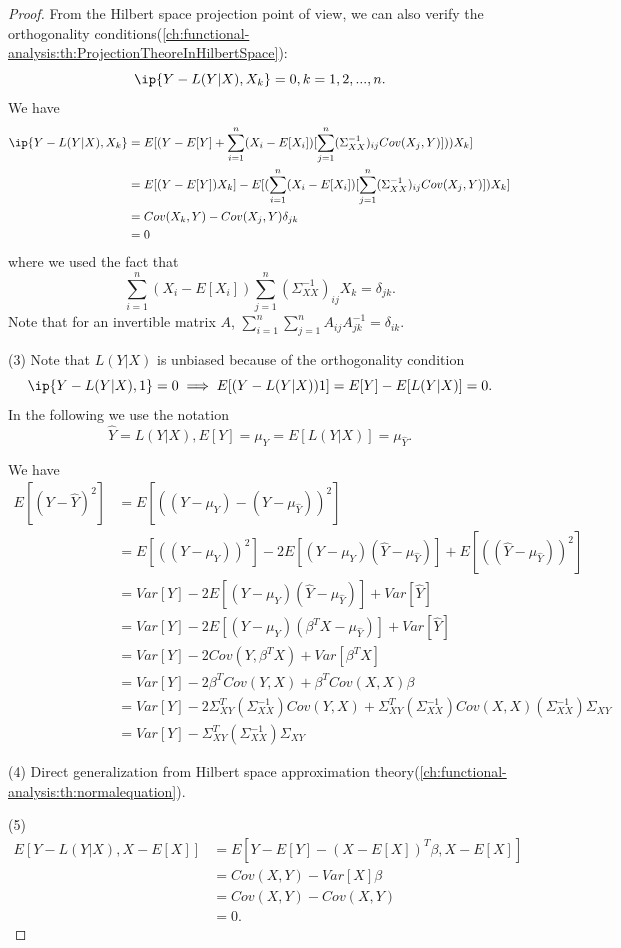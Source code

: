 \begin{refsection}
\begin{proof}
From the Hilbert space projection point of view, we can also verify the orthogonality conditions(\autoref{ch:functional-analysis:th:ProjectionTheoreInHilbertSpace}):
$$\ip{Y-L(Y|X),X_k} = 0,k=1,2,...,n.$$
We have
\begin{align*}
\ip{Y-L(Y|X),X_k} &= E[(Y-E[Y] + \sum_{i=1}^n (X_i - E[X_i]) [\sum_{j=1}^n(\Sigma_{XX}^{-1})_{ij}Cov(X_j,Y)]))X_k] \\
&=E[(Y - E[Y])X_k] -  E[(\sum_{i=1}^n (X_i - E[X_i]) [\sum_{j=1}^n(\Sigma_{XX}^{-1})_{ij}Cov(X_j,Y)])X_k] \\
&=Cov(X_k,Y) - Cov(X_j,Y)\delta_{jk} \\
&=0 
\end{align*}
where we used the fact that
$$\sum_{i=1}^n (X_i - E[X_i]) \sum_{j=1}^n(\Sigma_{XX}^{-1})_{ij}X_k  = \delta_{jk}.$$
Note that for an invertible matrix $A$, $\sum_{i=1}^n\sum_{j=1}^n A_{ij}A^{-1}_{jk} = \delta_{ik}.$


(3) Note that $L(Y|X)$ is unbiased because of the orthogonality condition $$\ip{Y-L(Y|X),1} =0 \implies E[(Y-L(Y|X))1] = E[Y] - E[L(Y|X)] = 0.$$ 
In the following we use the notation $$\hat{Y} = L(Y|X), E[Y] = \mu_Y = E[L(Y|X)] = \mu_{\hat{Y}}.$$

We have
\begin{align*}
E[(Y - \hat{Y})^2] &= E[((Y - \mu_Y) - (\hat{Y} - \mu_{\hat{Y}}))^2] \\
	&= E[((Y - \mu_Y))^2] - 2E[(Y - \mu_Y)(\hat{Y} - \mu_{\hat{Y}})] + E[((\hat{Y} - \mu_{\hat{Y}}))^2] \\
		&= Var[Y] - 2E[(Y - \mu_Y)(\hat{Y} - \mu_{\hat{Y}})] + Var[\hat{Y}]\\
		&= Var[Y] - 2E[(Y - \mu_Y)(\beta^TX - \mu_{\hat{Y}})] + Var[\hat{Y}]\\
		&= Var[Y]  - 2Cov(Y,\beta^TX) + Var[\beta^TX]\\
		&= Var[Y]  - 2\beta^TCov(Y,X) + \beta^TCov(X,X)\beta\\
		&= Var[Y]  - 2\Sigma_{XY}^T(\Sigma_{XX}^{-1})Cov(Y,X) + \Sigma_{XY}^T(\Sigma_{XX}^{-1})Cov(X,X)(\Sigma_{XX}^{-1})\Sigma_{XY}\\
		&=Var[Y]  - \Sigma_{XY}^T(\Sigma_{XX}^{-1})\Sigma_{XY}	
\end{align*}

(4) Direct generalization from Hilbert space approximation theory(\autoref{ch:functional-analysis:th:normalequation}).

(5) 
\begin{align*}
E[Y-L(Y|X), X-E[X]] &= E[Y-E[Y]-(X-E[X])^T\beta, X-E[X]] \\
&=Cov(X,Y) - Var[X]\beta \\
&=Cov(X,Y) - Cov(X,Y) \\
&=0.
\end{align*}
\end{proof}




\end{refsection}

